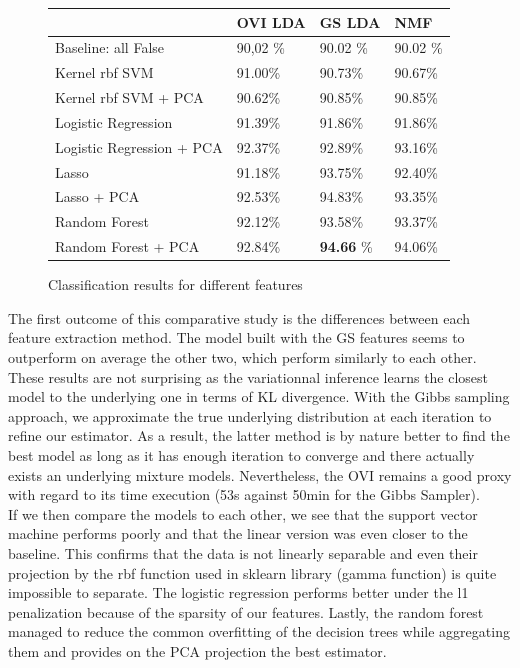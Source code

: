 \documentclass[twoside]{article}
\begin{document}
\begin{multicols}{2}
\begin{figure}[H]
\begin{center}
    \begin{tabular}{| l | l | l | l |}
    \hline
    & OVI LDA & GS LDA & NMF \\ \hline
    Baseline: all False & 90,02 \% &  90.02 \% &  90.02 \% \\ \hline
    Kernel rbf SVM & 91.00\%  &  90.73\%  &  90.67\% \\ \hline
    Kernel rbf SVM + PCA & 90.62\%  &  90.85\%  &  90.85\% \\ \hline
    Logistic Regression & 91.39\%  &  91.86\%  &  91.86\%\\ \hline
    Logistic Regression + PCA & 92.37\%  &  92.89\%  &  93.16\% \\ \hline
    Lasso & 91.18\%  &  93.75\%  &  92.40\% \\ \hline
	Lasso + PCA & 92.53\%  &  94.83\%  &  93.35\% \\ \hline
    Random Forest & 92.12\% &  93.58\% &  93.37\% \\ \hline
    Random Forest + PCA & 92.84\% &  \textbf{94.66} \% &  94.06\% \\ \hline
    \end{tabular}
\end{center}
\caption{Classification results for different features}
\end{figure}

\noindent The first outcome of this comparative study is the differences between each feature extraction method. The model built with the GS features seems to outperform on average the other two, which perform similarly to each other. These results are not surprising as the variationnal inference learns the closest model to the underlying one in terms of KL divergence. With the Gibbs sampling approach, we approximate the true underlying distribution at each iteration to refine our estimator. As a result, the latter method is by nature better to find the best model as long as it has enough iteration to converge and there actually exists an underlying mixture models. Nevertheless, the OVI remains a good proxy with regard to its time execution (53s against 50min for the Gibbs Sampler).\\

\noindent If we then compare the models to each other, we see that the support vector machine performs poorly and that the linear version was even closer to the baseline. This confirms that the data is not linearly separable and even their projection by the rbf function used in sklearn library (gamma function) is quite impossible to separate. The logistic regression performs better under the l1 penalization because of the sparsity of our features. Lastly, the random forest managed to reduce the common overfitting of the decision trees while aggregating them and provides on the PCA projection the best estimator.\\


\end{multicols}
\end{document}

